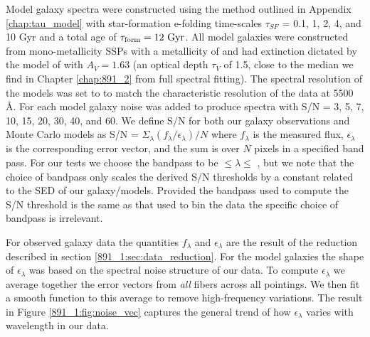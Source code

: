 Model galaxy spectra were constructed using the method outlined in
Appendix \ref{chap:tau_model} with star-formation e-folding
time-scales $\tau_{SF}$ = 0.1, 1, 2, 4, and 10 Gyr and a total age of
$\tau_\mathrm{form} = 12~\mathrm{Gyr} $.  All model galaxies were
constructed from mono-metallicity SSPs with a metallicity of
 and had extinction dictated by the model of
\citet{Charlot00} with $A_V=1.63$ (an optical depth $\tau_V$ of 1.5,
close to the median we find in Chapter \ref{chap:891_2} from full
spectral fitting). The spectral resolution of the models was set to
 to match the characteristic resolution of the data at
5500 \AA. For each model galaxy noise was added to produce spectra
with S/N = 3, 5, 7, 10, 15, 20, 30, 40, and 60. We define S/N for both
our galaxy observations and Monte Carlo models as S/N =
$\Sigma_{\lambda}\left(f_\lambda/\epsilon_\lambda\right)/N$ where
$f_\lambda$ is the measured flux, $\epsilon_\lambda$ is the
corresponding error vector, and the sum is over $N$ pixels in a
specified band pass. For our tests we choose the bandpass to be
 $\leq \lambda \leq$ , but we note that
the choice of bandpass only scales the derived S/N thresholds by a
constant related to the SED of our galaxy/models. Provided the
bandpass used to compute the S/N threshold is the same as that used to
bin the data the specific choice of bandpass is irrelevant.

For observed galaxy data the quantities $f_\lambda$ and
$\epsilon_\lambda$ are the result of the reduction described in
section \ref{891_1:sec:data_reduction}. For the model galaxies the
shape of $\epsilon_\lambda$ was based on the spectral noise structure
of our data.  To compute $\epsilon_\lambda$ we average together the
error vectors from \emph{all} fibers across all pointings. We then fit
a smooth function to this average to remove high-frequency
variations. The result in Figure \ref{891_1:fig:noise_vec} captures
the general trend of how $\epsilon_\lambda$ varies with wavelength in
our data.




